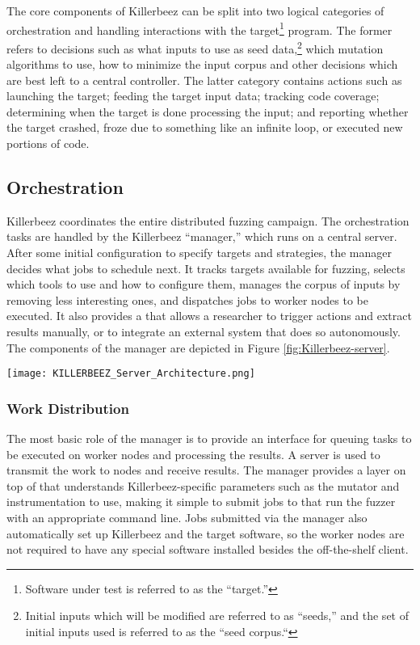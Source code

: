 The core components of Killerbeez can be split into two logical categories
of orchestration and handling interactions with the target\footnote{Software under test is referred to as the ``target.''}
program.  The former refers to decisions such as what
inputs to use as seed data,\footnote{Initial inputs which will be modified
are referred to as ``seeds,'' and the set of initial inputs used is referred to as the ``seed corpus.``} which mutation algorithms to use, how to minimize
the input corpus and other decisions which are best left to a central
controller.  The latter category contains actions such as launching the target;
feeding the target input data; tracking code coverage; determining when the target is
done processing the input; and reporting whether the target crashed, froze due
to something like an infinite loop, or executed new portions of code.

\subsection{Orchestration}
Killerbeez coordinates the entire distributed fuzzing
campaign. The orchestration tasks are handled by the Killerbeez ``manager,''
which runs on a central server. After some initial configuration to specify
targets and strategies, the manager decides what jobs to schedule next.
It tracks targets available for fuzzing, selects which tools to
use and how to configure them, manages the corpus of inputs by removing
less interesting ones, and dispatches jobs to worker nodes to be executed.  It also
provides a \REST{} \API{} that allows a researcher to trigger actions and
extract results manually, or to integrate an external system that
does so autonomously. The components of the manager are depicted in Figure
\ref{fig:Killerbeez-server}.

\begin{figure*}[!ht]
\centering
\texttt{[image: KILLERBEEZ\_Server\_Architecture.png]}
\caption{Killerbeez Server Architecture}
\label{fig:Killerbeez-server}
\end{figure*}

\subsubsection{Work Distribution}
The most basic role of the manager is to provide an interface for queuing tasks
to be executed on worker nodes and processing the results. A \BOINC{} server is
used to transmit the work to nodes and receive results. The manager provides a
layer on top of \BOINC{} that understands Killerbeez-specific parameters such as
the mutator and instrumentation to use, making it simple to submit jobs to
\BOINC{} that run the fuzzer with an appropriate command line. Jobs
submitted via the manager also automatically set up Killerbeez and the target
software, so the worker nodes are not required to have any special software
installed besides the off-the-shelf \BOINC{} client.

